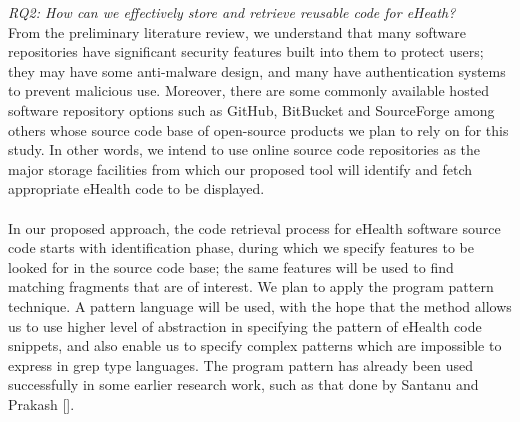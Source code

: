 \documentclass[a4paper]{article}
\begin{document}
\textit{RQ2: How can we effectively store and retrieve reusable code for eHeath?} \\
From the preliminary literature review, we understand that many software repositories have significant security features built into them to protect users; they may have some anti-malware design, and many have authentication systems to prevent malicious use. Moreover, there are some commonly available hosted software repository options such as GitHub, BitBucket and SourceForge among others whose source code base of open-source products we plan to rely on for this study. In other words, we intend to use online source code repositories as the major storage facilities from which our proposed tool will identify and fetch appropriate eHealth code to be displayed. \\ \\
In our proposed approach, the code retrieval process for eHealth software source code starts with identification phase, during which we specify features to be looked for in the source code base; the same features will be used to find matching fragments that are of interest. We plan to apply the program pattern technique. A pattern language will be used, with the hope that the method allows us to use higher level of abstraction
in specifying the pattern of eHealth code snippets, and also enable us to specify complex patterns which are impossible to express in grep
type languages. The program pattern has already been used successfully in some earlier research work, such as that done by Santanu and Prakash [].
\end{document}
